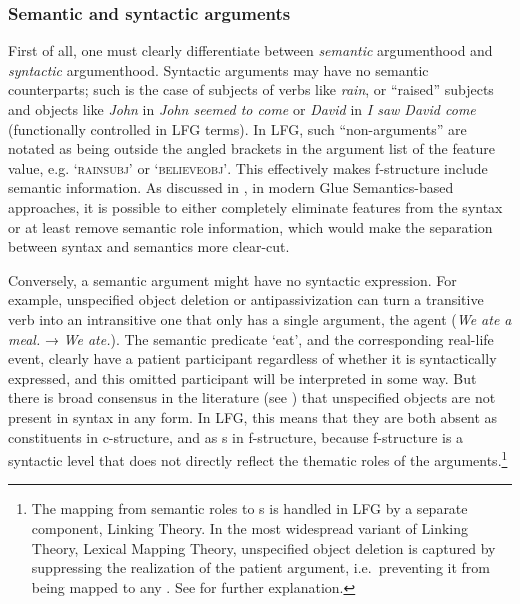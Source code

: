 \documentclass[output=paper]{../langscibook}
\begin{document}
 \subsubsection{Semantic and syntactic arguments\label{sect:gfs:semsynarg}}
 First of all, one must clearly differentiate between \textit{semantic} argumenthood and \textit{syntactic} argumenthood. Syntactic arguments may have no semantic counterparts; such is the case of subjects of verbs like \textit{rain}, or ``raised'' subjects and objects like \textit{John} in \textit{John seemed to come} or \textit{David} in \textit{I saw David come} (functionally controlled in LFG terms). In LFG, such ``non-arguments'' are notated as being outside the angled brackets in the argument list of the \PRED feature value, e.g. \textsc{`rain\arglist{~}subj'} or \textsc{`believeobj'}. This effectively makes f-structure include semantic information. As discussed in , in modern Glue Semantics-based approaches, it is possible to either completely eliminate \PRED features from the syntax or at least remove semantic role information, which would make the separation between syntax and semantics more clear-cut.
 
 Conversely, a semantic argument might have no syntactic expression. For example, unspecified object deletion or antipassivization can turn a transitive verb into an intransitive one that only has a single argument, the agent (\textit{We ate a meal.} → \textit{We ate.}). The semantic predicate `eat', and the corresponding real-life event, clearly have a patient participant regardless of whether it is syntactically expressed, and this omitted participant will be interpreted in some way. But there is broad consensus in the literature (see \cite{melchin2019}) that unspecified objects are not present in syntax in any form. In LFG, this means that they are both absent as constituents in c-structure, and as {\GF}s in f-structure, because f-structure is a syntactic level that does not directly reflect the thematic roles of the arguments.\footnote{The mapping from semantic roles to {\GF}s is handled in LFG by a separate component, Linking Theory. In the most widespread variant of Linking Theory, Lexical Mapping Theory, unspecified object deletion is captured by suppressing the realization of the patient argument, i.e.\ preventing it from being mapped to any \GF. See  for further explanation.}
 
\end{document}
